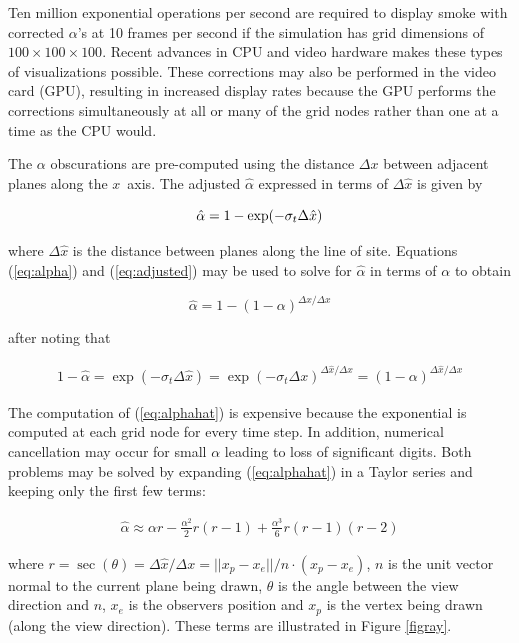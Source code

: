 {Ten million exponential operations per second are required to display smoke with corrected $\alpha$'s at 10 frames per second if the simulation has grid dimensions of $100\times 100\times 100$. Recent advances in CPU and video hardware makes these types of visualizations possible. These corrections may also be performed in the video card (GPU), resulting in increased display rates because the GPU performs the corrections simultaneously at all or many of the grid nodes rather than one at a time as the CPU would.

The $\alpha$ obscurations are pre-computed using the distance
$\Delta x$ between adjacent planes along the $x$~axis. The
adjusted $\hat{\alpha}$ expressed in terms of $\Delta\hat{x}$ is
given by

\begin{equation}
\label{eq:adjusted}
\hat{\alpha}=1-\exp(-\sigma_t\Delta \hat{x})\\
\end{equation}

where $\Delta\hat{x}$ is the distance between planes along the line of site.  Equations (\ref{eq:alpha}) and (\ref{eq:adjusted}) may be used to solve for $\hat{\alpha}$ in terms of $\alpha$ to obtain

\begin{equation}
\label{eq:alphahat}
\hat{\alpha}=1-(1-\alpha)^{\Delta\hat{x}/\Delta x}
\end{equation}

after noting that

\begin{eqnarray}
1-\hat{\alpha}=\exp(-\sigma_t\Delta\hat{x})=\exp(-\sigma_t\Delta
x)^{\Delta\hat{x}/\Delta x}=(1-\alpha)^{\Delta\hat{x}/\Delta x}
\end{eqnarray}

The computation of (\ref{eq:alphahat}) is expensive because the exponential is computed at each grid node for every time step.  In addition, numerical cancellation may occur for small $\alpha$ leading to loss of significant digits. Both problems may be solved by expanding (\ref{eq:alphahat}) in a Taylor series and keeping only the first few terms:

\begin{eqnarray}
\hat{\alpha}\approx \alpha r -
\frac{\alpha^2}{2}r(r-1)+\frac{\alpha^3}{6}r(r-1)(r-2)
\end{eqnarray}

where $r=\sec(\theta)=\Delta \hat{x}/\Delta x=||x_p-x_e||/n\cdot(x_p-x_e)$, $n$ is the unit vector normal to the current plane being drawn, $\theta$ is the angle between the view direction and $n$, $x_e$ is the observers position and $x_p$ is the vertex being drawn (along the view direction).  These terms are illustrated in Figure \ref{figray}.

}
